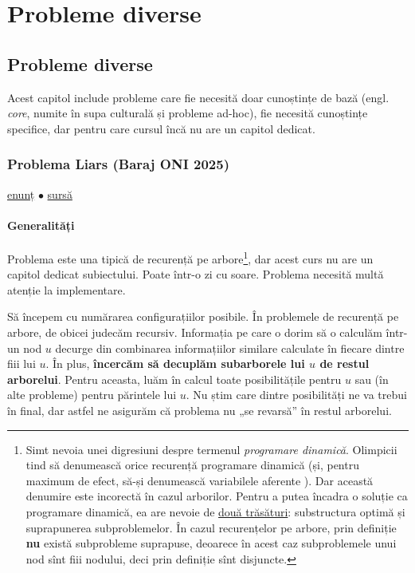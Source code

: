 \part{Probleme diverse}

\chapter{Probleme diverse}

Acest capitol include probleme care fie necesită doar cunoștințe de bază (engl. \textit{core}, numite în supa culturală și probleme ad-hoc), fie necesită cunoștințe specifice, dar pentru care cursul încă nu are un capitol dedicat.

\section{Problema Liars (Baraj ONI 2025)}
\label{problem:liars}

\href{https://kilonova.ro/problems/3730}{enunț}
$\bullet$
\hyperref[code:liars]{sursă}

\subsection{Generalități}

Problema este una tipică de recurență pe arbore\footnote{Simt nevoia unei digresiuni despre termenul \textit{programare dinamică}. Olimpicii tind să denumească orice recurență programare dinamică (și, pentru maximum de efect, să-și denumească variabilele aferente ). Dar această denumire este incorectă în cazul arborilor. Pentru a putea încadra o soluție ca programare dinamică, ea are nevoie de \href{https://en.wikipedia.org/wiki/Dynamic_programming\#Computer_science}{două trăsături}: substructura optimă și suprapunerea subproblemelor. În cazul recurențelor pe arbore, prin definiție \textbf{nu} există subprobleme suprapuse, deoarece în acest caz subproblemele unui nod sînt fiii nodului, deci prin definiție sînt disjuncte.}, dar acest curs nu are un capitol dedicat subiectului. Poate într-o zi cu soare. Problema necesită multă atenție la implementare.

Să începem cu numărarea configurațiilor posibile. În problemele de recurență pe arbore, de obicei judecăm recursiv. Informația pe care o dorim să o calculăm într-un nod $u$ decurge din combinarea informațiilor similare calculate în fiecare dintre fiii lui $u$. În plus, \textbf{încercăm să decuplăm subarborele lui $u$ de restul arborelui}. Pentru aceasta, luăm în calcul toate posibilitățile pentru $u$ sau (în alte probleme) pentru părintele lui $u$. Nu știm care dintre posibilități ne va trebui în final, dar astfel ne asigurăm că problema nu „se revarsă” în restul arborelui.

